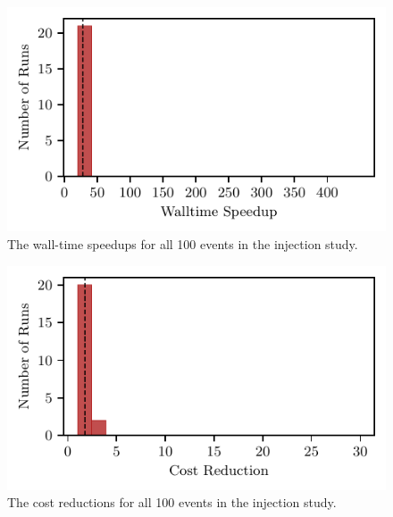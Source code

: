 \documentclass[fleqn,usenatbib]{mnras}
\begin{document}
\begin{figure}
    \centering
    \includegraphics{figures/walltime_speedup.pdf}
    \caption{The wall-time speedups for all 100 events in the injection study.}
    \label{fig:speedup_comparison}
\end{figure}

\begin{figure}
    \centering
    \includegraphics{figures/cost_reduction.pdf}
    \caption{The cost reductions for all 100 events in the injection study.}
    \label{fig:cost_reduction}
\end{figure}
\end{document}
